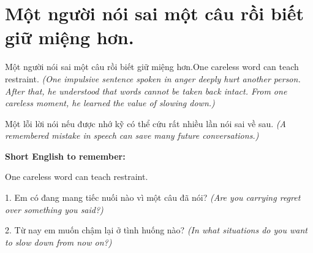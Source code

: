 \section{Một người nói sai một câu rồi biết giữ miệng hơn.}
\begin{truyen}{Một người nói sai một câu rồi biết giữ miệng hơn.}{One careless word can teach restraint.}
\textit{(One impulsive sentence spoken in anger deeply hurt another person. After that, he understood that words cannot be taken back intact. From one careless moment, he learned the value of slowing down.)}
\end{truyen}
\begin{baihoc}
Một lỗi lời nói nếu được nhớ kỹ có thể cứu rất nhiều lần nói sai về sau.
\textit{(A remembered mistake in speech can save many future conversations.)}
\end{baihoc}
\begin{ghinhoanh}\textbf{Short English to remember:}

One careless word can teach restraint.
\end{ghinhoanh}
\begin{tuhocnhanh}
1. Em có đang mang tiếc nuối nào vì một câu đã nói? \textit{(Are you carrying regret over something you said?)}

2. Từ nay em muốn chậm lại ở tình huống nào? \textit{(In what situations do you want to slow down from now on?)}
\end{tuhocnhanh}
\ngancach

